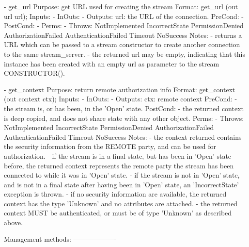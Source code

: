 \begin{myspec}
    - get_url
      Purpose:  get URL used for creating the stream
      Format:   get_url               (out url       url);
      Inputs:   -
      InOuts:   -
      Outputs:  url:                  the URL of the connection.
      PreCond:  -
      PostCond: -
      Perms:    -
      Throws:   NotImplemented
                IncorrectState
                PermissionDenied
                AuthorizationFailed
                AuthenticationFailed
                Timeout
                NoSuccess
      Notes:    - returns a URL which can be passed to a
                  stream constructor to create another
                  connection to the same stream_server.
                - the returned url may be empty, indicating that
                  this instance has been created with an empty
                  url as parameter to the stream CONSTRUCTOR().
 
 
    - get_context
      Purpose:  return remote authorization info
      Format:   get_context           (out context ctx);
      Inputs:   -
      InOuts:   -
      Outputs:  ctx:                   remote context
      PreCond:  - the stream is, or has been, in the 'Open' 
                  state.
      PostCond: - the returned context is deep copied, and does
                  not share state with any other object.
      Perms:    -
      Throws:   NotImplemented
                IncorrectState
                PermissionDenied
                AuthorizationFailed
                AuthenticationFailed
                Timeout
                NoSuccess
      Notes:    - the context returned contains the security
                  information from the REMOTE party, and can be 
                  used for authorization.
                - if the stream is in a final state, but has
                  been in 'Open' state before, the returned
                  context represents the remote party the stream
                  has been connected to while it was in 'Open'
                  state.
                - if the stream is not in 'Open' state, and is
                  not in a final state after having been in
                  'Open' state, an 'IncorrectState' exception is
                  thrown.
                - if no security information are available, the
                  returned context has the type 'Unknown' and no
                  attributes are attached.
                - the returned context MUST be authenticated, or
                  must be of type 'Unknown' as described above.
 
 
    Management methods:
    -------------------
 

\end{myspec}
